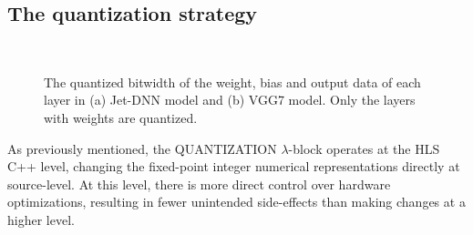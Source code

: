 \subsection{The quantization strategy}\label{sec:quant}

\begin{figure} 
   \centering
   \\
\vspace{0.2cm}    
  \caption{The quantized bitwidth of the weight, bias and output data of each layer in (a) Jet-DNN model and (b) VGG7 model. Only the layers with weights are quantized.}
  \label{fig:quantization_results} 
\end{figure}

 

As previously mentioned, the QUANTIZATION $\lambda$-block operates at the HLS C++ level, changing the fixed-point integer numerical representations directly at source-level. At this level, there is more direct control over hardware optimizations, resulting in fewer unintended side-effects than making changes at a higher level. 

